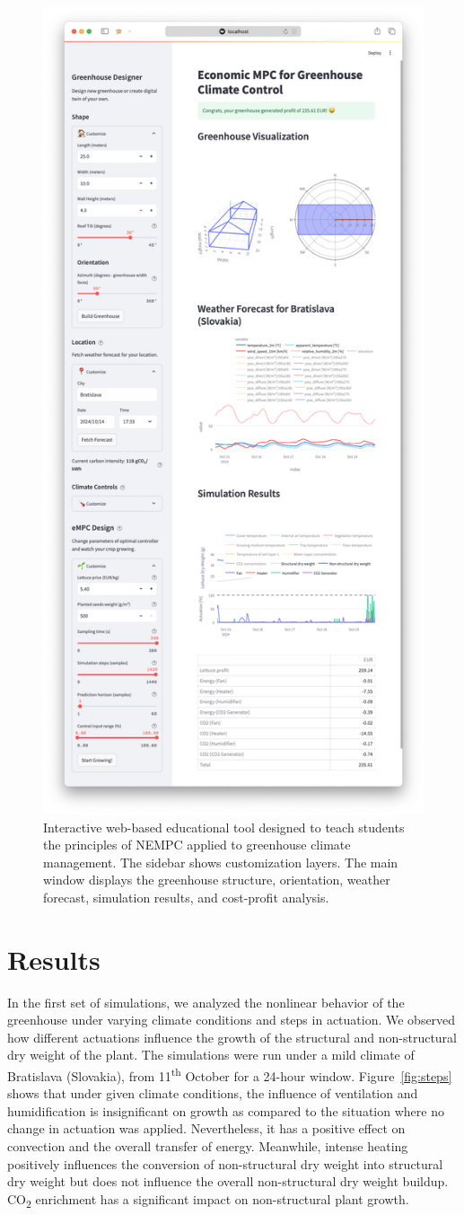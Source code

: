 \documentclass[conference]{IEEEtran}
\begin{document}
\begin{figure}\label{fig:web}
    \centering
    \includegraphics[width=.5\textwidth]{figures/webpage.png}
    \caption{Interactive web-based educational tool designed to teach students the principles of NEMPC applied to greenhouse climate management. The sidebar shows customization layers. The main window displays the greenhouse structure, orientation, weather forecast, simulation results, and cost-profit analysis.}
\end{figure}

\section{Results}
In the first set of simulations, we analyzed the nonlinear behavior of the greenhouse under varying climate conditions and steps in actuation. We observed how different actuations influence the growth of the structural and non-structural dry weight of the plant. The simulations were run under a mild climate of Bratislava (Slovakia), from 11\textsuperscript{th} October for a 24-hour window. Figure~\ref{fig:steps} shows that under given climate conditions,
the influence of ventilation and humidification is insignificant on growth as compared to the situation where no change in actuation was applied.
Nevertheless, it has a positive effect on convection and the overall transfer of energy. Meanwhile, intense heating positively influences the conversion of non-structural dry weight into structural dry weight but does not influence the overall non-structural dry weight buildup. CO\textsubscript{2} enrichment has a significant impact on non-structural plant growth.
\end{document}
